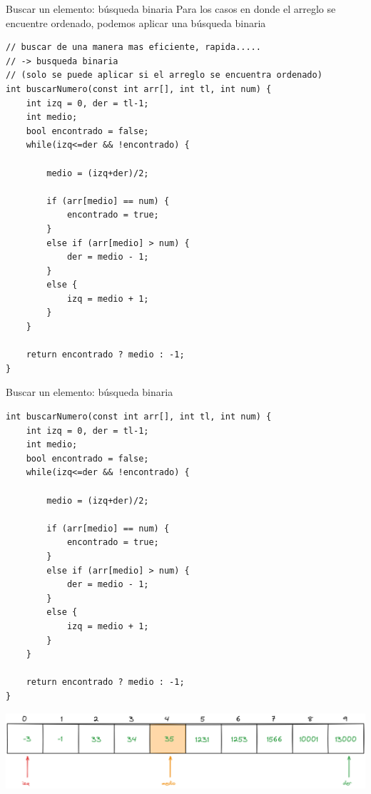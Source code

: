 \documentclass[12pt]{beamer}
\begin{document}
\begin{frame}[fragile]{Buscar un elemento: búsqueda binaria}
    Para los casos en donde el arreglo se encuentre \alert{ordenado}, podemos aplicar una búsqueda binaria
\begin{lstlisting}[basicstyle=\tiny]
// buscar de una manera mas eficiente, rapida.....
// -> busqueda binaria
// (solo se puede aplicar si el arreglo se encuentra ordenado)
int buscarNumero(const int arr[], int tl, int num) {
	int izq = 0, der = tl-1;
	int medio;
	bool encontrado = false;
	while(izq<=der && !encontrado) {
		
		medio = (izq+der)/2;
		
		if (arr[medio] == num) {
			encontrado = true;
		}
		else if (arr[medio] > num) {
			der = medio - 1;
		}
		else {
			izq = medio + 1;
		}
	}
	
	return encontrado ? medio : -1;
}
\end{lstlisting}
\end{frame}

\begin{frame}[fragile]{Buscar un elemento: búsqueda binaria}
\begin{lstlisting}[basicstyle=\tiny]
int buscarNumero(const int arr[], int tl, int num) {
    int izq = 0, der = tl-1;
    int medio;
    bool encontrado = false;
    while(izq<=der && !encontrado) {
        
        medio = (izq+der)/2;
        
        if (arr[medio] == num) {
            encontrado = true;
        }
        else if (arr[medio] > num) {
            der = medio - 1;
        }
        else {
            izq = medio + 1;
        }
    }
    
    return encontrado ? medio : -1;
}
\end{lstlisting}
    \includegraphics[width=\textwidth]{busqueda_binaria_1.png}
\end{frame}
\end{document}
